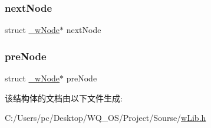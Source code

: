 \subsubsection{\texorpdfstring{next\+Node}{nextNode}}
{\footnotesize\ttfamily struct \mbox{\hyperlink{struct__w_node}{\+\_\+w\+Node}}$\ast$ next\+Node}

\mbox{\label{struct__w_node_abc26422bd712b569f20f912470cdca6d}} 
\subsubsection{\texorpdfstring{pre\+Node}{preNode}}
{\footnotesize\ttfamily struct \mbox{\hyperlink{struct__w_node}{\+\_\+w\+Node}}$\ast$ pre\+Node}



该结构体的文档由以下文件生成\+:\begin{DoxyCompactItemize}
\item 
C\+:/\+Users/pc/\+Desktop/\+W\+Q\+\_\+\+O\+S/\+Project/\+Sourse/\mbox{\hyperlink{w_lib_8h}{w\+Lib.\+h}}\end{DoxyCompactItemize}
